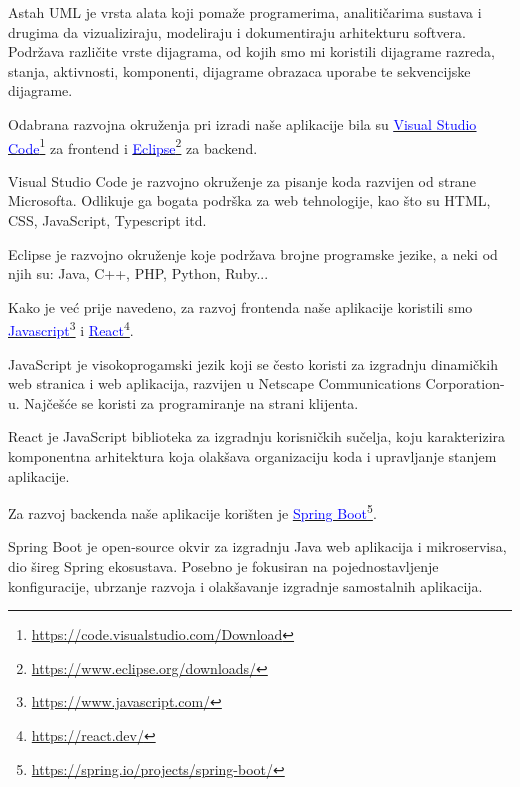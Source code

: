 Astah UML je vrsta alata koji pomaže programerima, analitičarima sustava i drugima da vizualiziraju, modeliraju i dokumentiraju arhitekturu softvera. Podržava različite vrste dijagrama, od kojih smo mi koristili dijagrame razreda, stanja, aktivnosti, komponenti, dijagrame obrazaca uporabe te sekvencijske dijagrame.

Odabrana razvojna okruženja pri izradi naše aplikacije bila su \textcolor{blue}{\underline{\href{https://code.visualstudio.com/Download}{\textcolor{blue}{Visual Studio Code}}}}\footnote{\url{https://code.visualstudio.com/Download}} za frontend i \textcolor{blue}{\underline{\href{https://www.eclipse.org/downloads/}{\textcolor{blue}{Eclipse}}}}\footnote{\url{https://www.eclipse.org/downloads/}} za backend.


Visual Studio Code je razvojno okruženje za pisanje koda razvijen od strane Microsofta. Odlikuje ga bogata podrška za web tehnologije, kao što su HTML, CSS, JavaScript, Typescript itd.

Eclipse je razvojno okruženje koje podržava brojne programske jezike, a neki od njih su: Java, C++, PHP, Python, Ruby...

Kako je već prije navedeno, za razvoj frontenda naše aplikacije koristili smo \textcolor{blue}{\underline{\href{https://www.javascript.com/}{\textcolor{blue}{Javascript}}}}\footnote{\url{https://www.javascript.com/}} i \textcolor{blue}{\underline{\href{https://react.dev/}{\textcolor{blue}{React}}}}\footnote{\url{https://react.dev/}}.

JavaScript je visokoprogamski jezik koji se često koristi za izgradnju dinamičkih web stranica i web aplikacija, razvijen u Netscape Communications Corporation-u. Najčešće se koristi za programiranje na strani klijenta.

React je JavaScript biblioteka za izgradnju korisničkih sučelja, koju karakterizira komponentna arhitektura koja olakšava organizaciju koda i upravljanje stanjem aplikacije.

Za razvoj backenda naše aplikacije korišten je \textcolor{blue}{\underline{\href{https://spring.io/projects/spring-boot/}{\textcolor{blue}{Spring Boot}}}}\footnote{\url{https://spring.io/projects/spring-boot/}}.

Spring Boot je open-source okvir za izgradnju Java web aplikacija i mikroservisa, dio šireg Spring ekosustava. Posebno je fokusiran na pojednostavljenje konfiguracije, ubrzanje razvoja i olakšavanje izgradnje samostalnih aplikacija.


			\eject 
			
